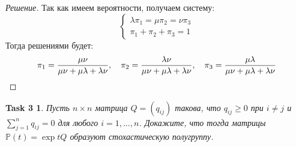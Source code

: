 \documentclass[12pt,a4paper]{extarticle}
\newtheorem*{task3}{Task 3}
\begin{document}
\begin{proof}[Решение]
		Так как имеем вероятности, получаем систему:
		\[
			\begin{cases}
 				\lambda \pi_1 = \mu \pi_2 = \nu \pi_3
 				\\
 				\pi_1 + \pi_2 + \pi_3 = 1
			\end{cases}
		\]
		Тогда решениями будет:
		\[
			\pi_1 = {\mu \nu \over \mu \nu + \mu \lambda + \lambda \nu}, 
			\quad
			\pi_2 = {\lambda \nu \over \mu \nu + \mu \lambda + \lambda \nu},
			\quad
			\pi_3 = {\mu \lambda \over \mu \nu + \mu \lambda + \lambda \nu}
		\]
	\end{proof}








	\newpage
	
	\begin{task3}
		Пусть $n \times n$ матрица $Q = (q_{ij})$ такова, что $q_{ij} \geq 0$ при $i \neq j$ и $\sum_{j=1}^n q_{ij} = 0$ для
		любого $i = 1, \ldots , n$. Докажите, что тогда матрицы $\mathbb{P} (t) = \exp{tQ}$ образуют
		стохастическую полугруппу.
	\end{task3}
\end{document}
